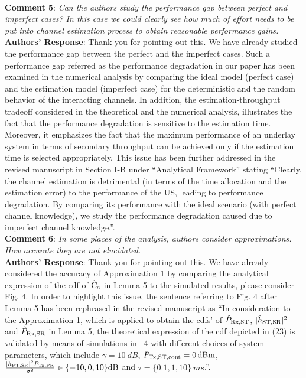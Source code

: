 \documentclass[12pt,a4wide,peerreview]{IEEEtran}
\newcommand{\tc}[1]{#1}
\begin{document}
\\
\textbf{Comment 5}: 
\textit{
Can the authors study the performance gap between perfect and imperfect cases? In this case we could clearly see how much of effort needs to be put into channel estimation process to obtain reasonable performance gains.
}
\\
\textbf{Authors' Response}: 
Thank you for pointing out this. We have already studied the performance gap between the perfect and the imperfect cases. Such a performance gap referred as the performance degradation in our paper has been examined in the numerical analysis by comparing the ideal model (perfect case) and the estimation model (imperfect case) for the deterministic and the random behavior of the interacting channels. In addition, the estimation-throughput tradeoff considered in the theoretical and the numerical analysis, illustrates the fact that the performance degradation is sensitive to the estimation time. Moreover, it emphasizes the fact that the maximum performance of an underlay system in terms of secondary throughput can be achieved only if the estimation time is selected appropriately. This issue has been further addressed in the revised manuscript in Section I-B under ``Analytical Framework'' stating ``Clearly, the channel estimation is detrimental (in terms of the time allocation and the estimation error) to the performance of the US, leading to performance degradation. By comparing its performance with the ideal scenario (with perfect channel knowledge), we study the performance degradation caused due to imperfect channel knowledge.''.  
\\
\textbf{\tc{Comment 6}}: 
\textit{
In some places of the analysis, authors consider approximations. How accurate they are not elucidated.
}
\\
\textbf{Authors' Response}:
Thank you for pointing out this. We have already considered the accuracy of Approximation 1 by comparing the analytical expression of the cdf of $\hat{\text{{C}}}_{\text{s}}$ in Lemma 5 to the simulated results, please consider Fig. 4. In order to highlight this issue, the sentence referring to Fig. 4 after Lemma 5 has been rephrased in the revised manuscript as ``In consideration to the Approximation 1, which is applied to obtain the cdfs' of $\hat{P}_{\text{Rx,ST}}$, $|\hat{h}_{\text{ST,SR}}|^2$ and $\hat{P}_{\text{Rx,SR}}$ in Lemma 5, the theoretical expression of the cdf depicted in (23) is validated by means of simulations in \figurename~4 with different choices of system parameters, which include $\gamma = \SI{10}{dB}$, $P_{\text{Tx,ST,cont}} = \SI{0}{dBm}$, $\frac{|h_{\text{PT,SR}}|^2 P_{\text{Tx,PR}}}{\sigma^2} \in \{-10, 0, 10\} \SI{}{dB}$ and $\tau = \{0.1, 1, 10\} \SI{}{ms}$.''.
\end{document}
